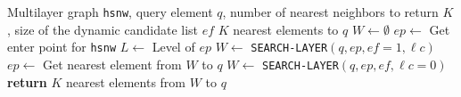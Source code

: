 \begin{algorithm}[H]
\caption{K-ANN-SEARCH(\texttt{hsnw}, $q$, $K$, $ef$)}\label{alg:knn}
\begin{algorithmic}[1]
\Require Multilayer graph \texttt{hsnw}, query element $q$, number of nearest neighbors to return $K$, size of the dynamic candidate list $ef$
\Ensure $K$ nearest elements to $q$
\State $W \gets \emptyset$ 
\State $ep \gets$ Get enter point for \texttt{hsnw}
\State $L \gets$ Level of $ep$ 
    \State $W \gets$ \texttt{SEARCH-LAYER}$(q, ep, {ef}=1, \ell{c})$
    \State $ep \gets$ Get nearest element from $W$ to $q$
\EndFor
\State $W \gets$ \texttt{SEARCH-LAYER}$(q, ep, {ef}, \ell{c}=0)$
\State \textbf{return} $K$ nearest elements from $W$ to $q$
\end{algorithmic}
\end{algorithm}
